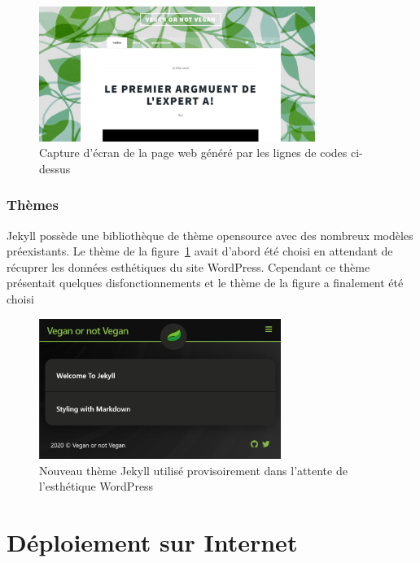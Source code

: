 \vspace{1cm}
\begin{figure}[!ht]
    \begin{center}
        \includegraphics[width=0.8\textwidth]{assets/s1a.PNG}
        \caption{Capture d'écran de la page web généré par les lignes de codes ci-dessus}
        \label{s1a}
    \end{center}
\end{figure}

\subsubsection{Thèmes}
Jekyll possède une bibliothèque de thème opensource avec des nombreux modèles préexistants. Le thème de la figure~\ref{s1a} avait d'abord été choisi en attendant de récuprer les données esthétiques du site WordPress. Cependant ce thème présentait quelques disfonctionnements et le thème de la figure a finalement été choisi

\begin{figure}[!h]
    \begin{center}
    \includegraphics[width=0.7\textwidth]{assets/newtheme.PNG}
    \end{center}
    \caption{Nouveau thème Jekyll utilisé provisoirement dans l'attente de l'esthétique WordPress}
\end{figure}

\section{Déploiement sur Internet}
